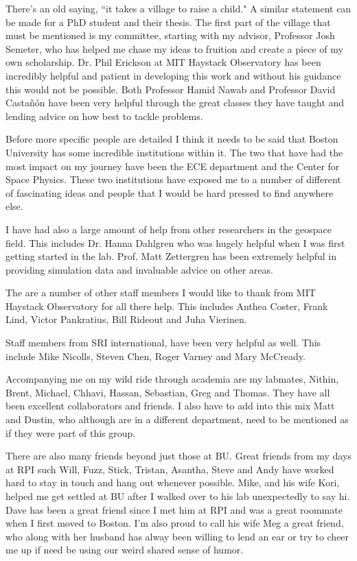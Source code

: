 There's an old saying, ``it takes a village to raise a child." A similar statement can be made for a PhD student and their thesis. The first part of the village that must be mentioned is my committee, starting with my advisor, Professor Josh Semeter, who has helped me chase my ideas to fruition and create a piece of my own scholarship. Dr. Phil Erickson at MIT Haystack Observatory has been incredibly helpful and patient in developing this work and without his guidance this would not be possible. Both Professor Hamid Nawab and Professor David Castañón have been very helpful through the great classes they have taught and lending advice on how best to tackle problems.

Before more specific people are detailed I think it needs to be said that Boston University has some incredible institutions within it. The two that have had the most impact on my journey have been the ECE department and the Center for Space Physics. These two institutions have exposed me to a number of different of fascinating ideas and people that I would be hard pressed to find anywhere else.

I have had also a large amount of help from other researchers in the geospace field. This includes Dr. Hanna Dahlgren who was hugely helpful when I was first getting started in the lab. Prof. Matt Zettergren has been extremely helpful in providing simulation data and invaluable advice on other areas.

The are a number of other staff members I would like to thank from MIT Haystack Observatory for all there help. This includes Anthea Coster, Frank Lind, Victor Pankratius, Bill Rideout and Juha Vierinen. 

Staff members from SRI international, have been very helpful as well. This include Mike Nicolls, Steven Chen, Roger Varney and Mary McCready.
 
Accompanying me on my wild ride through academia are my labmates, Nithin, Brent, Michael, Chhavi, Hassan, Sebastian, Greg and Thomas. They have all been excellent collaborators and friends. I also have to add into this mix Matt and Dustin, who although are in a different department, need to be mentioned as if they were part of this group.

There are also many friends beyond just those at BU. Great friends from my days at RPI such Will, Fuzz, Stick, Tristan, Asantha, Steve and Andy have worked hard to stay in touch and hang out whenever possible. Mike, and his wife Kori, helped me get settled at BU after I walked over to his lab unexpectedly to say hi. Dave has been a great friend since I met him at RPI and was a great roommate when I first moved to Boston. I'm also proud to call his wife Meg a great friend, who along with her husband has alway been willing to lend an ear or try to cheer me up if need be using our weird shared sense of humor.

